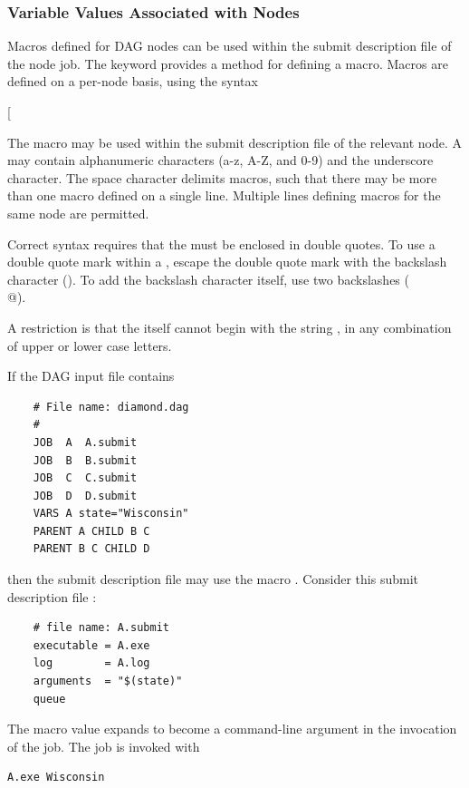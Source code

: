 \subsubsection{\label{dagman:VARS}Variable Values Associated with Nodes}

Macros defined for DAG nodes can be used within the submit description
file of the node job. 
The  keyword provides a method for defining a macro.
Macros are defined on a per-node basis, using the syntax

   [\Arg{"string"\Dots]}

The macro may be used within the
submit description file of the relevant node.  
A  may contain alphanumeric characters (a-z, A-Z, and 0-9)
and the underscore character.
The space character delimits macros,
such that there may be more than one macro defined on a single line.
Multiple lines defining macros for the same node are permitted.

Correct syntax requires that the  must be
enclosed in double quotes.
To use a double quote mark within a ,
escape the double quote mark with the backslash character (\verb@\@).
To add the backslash character itself, use two backslashes (\verb@\\@).

A restriction is that the  itself cannot begin with the string
,
in any combination of upper or lower case letters.


If the DAG input file contains
\footnotesize
\begin{verbatim}
    # File name: diamond.dag
    #
    JOB  A  A.submit 
    JOB  B  B.submit 
    JOB  C  C.submit	
    JOB  D  D.submit
    VARS A state="Wisconsin"
    PARENT A CHILD B C
    PARENT B C CHILD D

\end{verbatim}
\normalsize

then the submit description file  may use 
the macro \verb@state@.
Consider this 
submit description file :

\footnotesize
\begin{verbatim}
    # file name: A.submit
    executable = A.exe
    log        = A.log
    arguments  = "$(state)"
    queue
\end{verbatim}
\normalsize
The macro value expands to become a command-line argument in 
the invocation of the job.
The job is invoked with
\footnotesize
\begin{verbatim}
A.exe Wisconsin
\end{verbatim}
\normalsize

